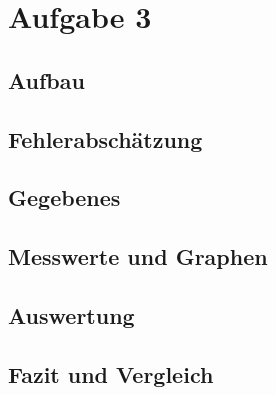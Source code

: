 \section{Aufgabe 3}
\subsection{Aufbau}
\subsection{Fehlerabschätzung}
\subsection{Gegebenes}
\subsection{Messwerte und Graphen}
\subsection{Auswertung}
\subsection{Fazit und Vergleich}